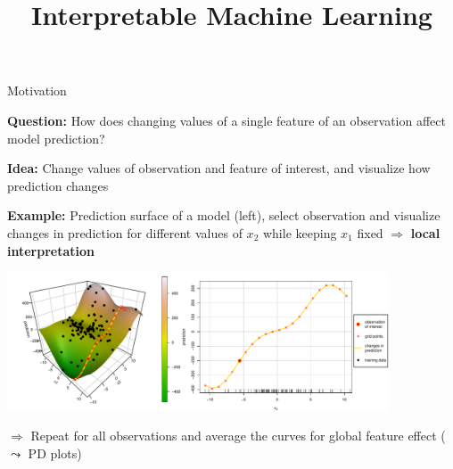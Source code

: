 \documentclass[11pt,compress,t,notes=noshow, aspectratio=169, xcolor=table]{beamer}
\title{Interpretable Machine Learning}
\date{}
\begin{document}
\newcommand{\titlefigure}{figure/feature-effect}
\newcommand{\learninggoals}{
\item ICE curves as local effect method
\item How to sample grid points for ICE curves
}



\begin{frame}{Motivation}

\textbf{Question:} How does changing values of a single feature of an observation affect model prediction?

\smallskip

\textbf{Idea:} Change values of observation and feature of interest, and visualize how prediction changes

\smallskip

\textbf{Example:} Prediction surface of a model (left), select observation and visualize changes in prediction for different values of $x_2$ while keeping $x_1$ fixed $\Rightarrow$ \textbf{local interpretation}

\centering
\includegraphics[width=0.85\textwidth]{figure/ice_motivation}

$\Rightarrow$ Repeat for all observations and average the curves for global feature effect ($\leadsto$ PD plots)
\end{frame}
\end{document}
